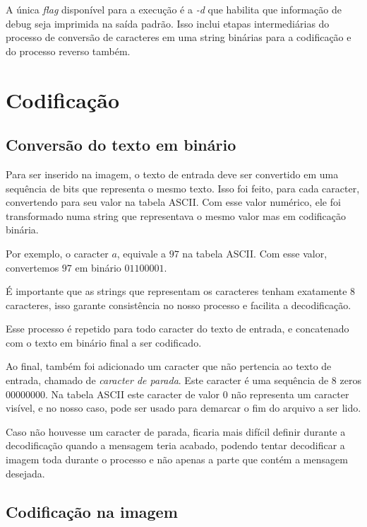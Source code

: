 \documentclass[conference]{IEEEtran}
\begin{document}
        A única \textit{flag} disponível para a execução é a \textit{-d} que habilita que informação de debug seja imprimida na saída padrão.
        Isso inclui etapas intermediárias do processo de conversão de caracteres em uma string binárias para a codificação e do processo reverso também.

\section {Codificação}

    \subsection{Conversão do texto em binário}

    Para ser inserido na imagem, o texto de entrada deve ser convertido em uma sequência de bits que representa o mesmo texto.
    Isso foi feito, para cada caracter, convertendo para seu valor na tabela ASCII. Com esse valor numérico, ele foi transformado numa string que representava o mesmo valor mas em codificação binária.

    Por exemplo, o caracter $a$, equivale a $97$ na tabela ASCII.
    Com esse valor, convertemos $97$ em binário $01100001$.

    É importante que as strings que representam os caracteres tenham exatamente $8$ caracteres, isso garante consistência no nosso processo e facilita a decodificação.

    Esse processo é repetido para todo caracter do texto de entrada, e concatenado com o texto em binário final a ser codificado.

    Ao final, também foi adicionado um caracter que não pertencia ao texto de entrada, chamado de \textit{caracter de parada}. Este caracter é uma sequência de 8 zeros $00000000$. Na tabela ASCII este caracter de valor $0$ não representa um caracter visível, e no nosso caso, pode ser usado para demarcar o fim do arquivo a ser lido.

    Caso não houvesse um caracter de parada, ficaria mais difícil definir durante a decodificação quando a mensagem teria acabado, podendo tentar decodificar a imagem toda durante o processo e não apenas a parte que contém a mensagem desejada.

    \subsection{Codificação na imagem}
\end{document}
